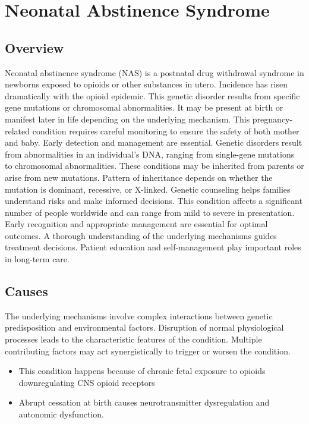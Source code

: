 \chapter{Neonatal Abstinence Syndrome}
\label{sec:Neonatal Abstinence Syndrome}

\section{Overview}
Neonatal abstinence syndrome (NAS) is a postnatal drug withdrawal syndrome in newborns exposed to opioids or other substances in utero. Incidence has risen dramatically with the opioid epidemic. This genetic disorder results from specific gene mutations or chromosomal abnormalities. It may be present at birth or manifest later in life depending on the underlying mechanism. This pregnancy-related condition requires careful monitoring to ensure the safety of both mother and baby. Early detection and management are essential. Genetic disorders result from abnormalities in an individual's DNA, ranging from single-gene mutations to chromosomal abnormalities. These conditions may be inherited from parents or arise from new mutations. Pattern of inheritance depends on whether the mutation is dominant, recessive, or X-linked. Genetic counseling helps families understand risks and make informed decisions. This condition affects a significant number of people worldwide and can range from mild to severe in presentation. Early recognition and appropriate management are essential for optimal outcomes. A thorough understanding of the underlying mechanisms guides treatment decisions. Patient education and self-management play important roles in long-term care.
\section{Causes}
The underlying mechanisms involve complex interactions between genetic predisposition and environmental factors. Disruption of normal physiological processes leads to the characteristic features of the condition. Multiple contributing factors may act synergistically to trigger or worsen the condition.

\begin{itemize}[noitemsep]
  \item This condition happens because of chronic fetal exposure to opioids downregulating CNS opioid receptors
  \item Abrupt cessation at birth causes neurotransmitter dysregulation and autonomic dysfunction.
\end{itemize}
